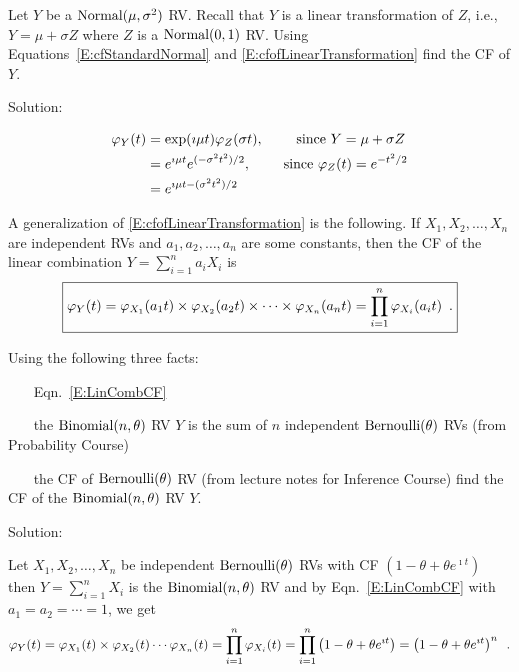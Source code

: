 \begin{example}\label{EgCFOfNormalMuSigma}
Let $Y$ be a $\mbox{{\rm Normal}}(\mu,\sigma^2)$ RV.  
Recall that $Y$ is a linear transformation of $Z$, i.e., $Y = \mu + \sigma Z$ where $Z$ is a $\mbox{{\rm Normal}}(0,1)$ RV.  
Using Equations~\eqref{E:cfStandardNormal} and \eqref{E:cfofLinearTransformation} find the CF of $Y$.

Solution:

\begin{align*}
\varphi_Y(t) 
& = \exp(\imath \mu t) \varphi_Z(\sigma t), \qquad \text{ since $Y = \mu + \sigma Z$}\\
& = e^{\imath \mu t} e^{(-\sigma^2 t^2)/2}, \qquad \text{ since $\varphi_Z(t)=e^{-t^2/2}$}\\
& = e^{\imath \mu t - (\sigma^2 t^2)/2}
\end{align*}
\end{example}

A generalization of \eqref{E:cfofLinearTransformation} is the following.  
If $X_1,X_2,\ldots,X_n$ are independent RVs and $a_1,a_2,\ldots,a_n$ are some constants, then the CF of the linear combination $Y=\sum_{i=1}^n a_i X_i$ is
\begin{equation}\label{E:LinCombCF} 
\boxed{
\varphi_Y (t) = \varphi_{X_1} (a_1 t) \times \varphi_{X_2} (a_2 t) \times \cdots \times \varphi_{X_n} (a_n t) = \prod_{i=1}^n \varphi_{X_i} (a_i t) \enspace .
}
\end{equation}
\begin{example}\label{EgCFOfBinomial}
Using the following three facts:
\bit 
\item~~~ Eqn.~\eqref{E:LinCombCF} 
\item~~~ the $\mbox{{\rm Binomial}}(n,\theta)$ RV $Y$ is the sum of $n$ independent $\mbox{{\rm Bernoulli}}(\theta)$ RVs (from Probability Course)  
\item~~~ the CF of $\mbox{{\rm Bernoulli}}(\theta)$ RV (from lecture notes for Inference Course)
\eit
find the CF of the $\mbox{{\rm Binomial}}(n,\theta)$ RV $Y$.

Solution:

Let $X_1,X_2,\ldots,X_n$ be independent $\mbox{{\rm Bernoulli}}(\theta)$ RVs with CF $\left( 1-\theta + \theta e^{\imath t} \right)$ then $Y=\sum_{i=1}^n  X_i$ is the $\mbox{{\rm Binomial}}(n,\theta)$ RV and by Eqn.~\eqref{E:LinCombCF} 
with $a_1=a_2=\cdots=1$, we get
\[
\varphi_Y (t) = \varphi_{X_1} ( t) \times \varphi_{X_2} (t) \cdots \varphi_{X_n} ( t)
= \prod_{i=1}^n \varphi_{X_i} ( t) = \prod_{i=1}^n \left( 1-\theta + \theta e^{\imath t} \right)
= \left( 1-\theta + \theta e^{\imath t} \right)^n \enspace . 
\]
\end{example}

